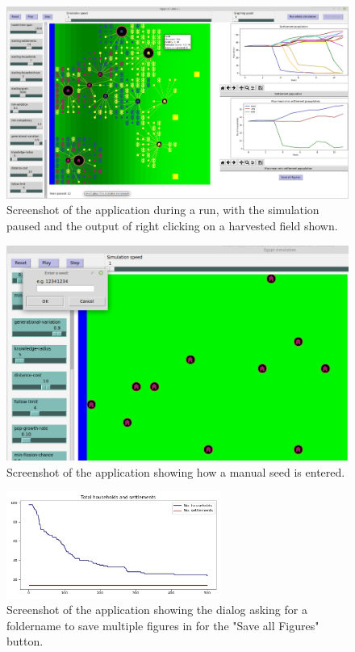 \documentclass[12pt]{article}
\begin{document}
	\begin{figure}[!htb]
		\includegraphics[width=15cm]{RightClickOnHarvestedField}
		\caption{Screenshot of the application during a run, with the simulation paused and the output of right clicking on a harvested field shown.}
		\label{fig:ClickOnHarvested}
	\end{figure}
	
	\begin{figure}[!htb]
		\includegraphics[width=15cm]{SeedEntry}
		\caption{Screenshot of the application showing how a manual seed is entered.}
		\label{fig:Seed Entry}
	\end{figure}
	
	\begin{figure}[!htb]
		\includegraphics[width=7cm]{Default_values_run1_A}
		\caption{Screenshot of the application showing the dialog asking for a foldername to save multiple figures in for the "Save all Figures" button.}
		\label{fig:Default_values_run_1_A}
	\end{figure}
\end{document}
